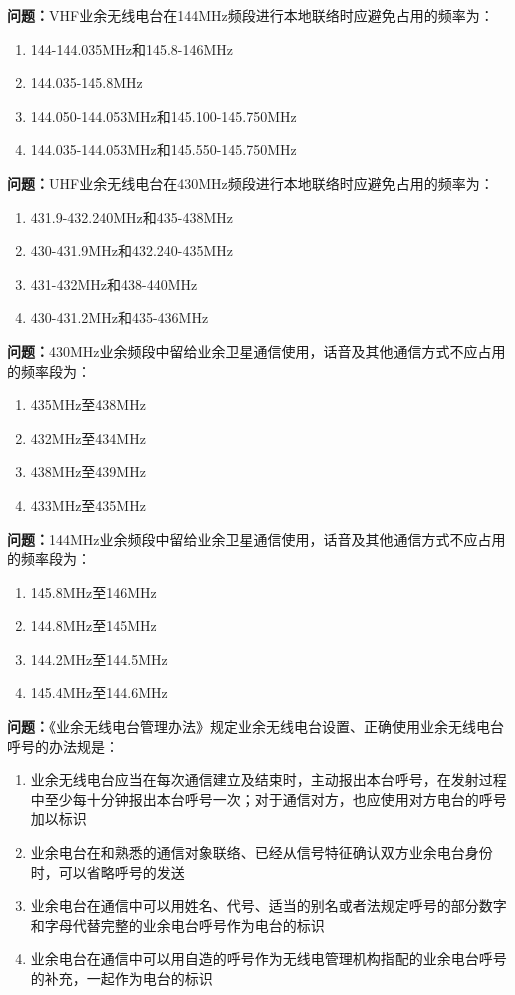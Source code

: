 \documentclass{ctexbook}%
\begin{document}
\textbf{问题：}VHF业余无线电台在144MHz频段进行本地联络时应避免占用的频率为：
\begin{enumerate}[label=\Alph*), leftmargin=3em]
\item 144-144.035MHz和145.8-146MHz
\item 144.035-145.8MHz
\item 144.050-144.053MHz和145.100-145.750MHz
\item 144.035-144.053MHz和145.550-145.750MHz
\end{enumerate}

\textbf{问题：}UHF业余无线电台在430MHz频段进行本地联络时应避免占用的频率为：
\begin{enumerate}[label=\Alph*), leftmargin=3em]
\item 431.9-432.240MHz和435-438MHz
\item 430-431.9MHz和432.240-435MHz
\item 431-432MHz和438-440MHz
\item 430-431.2MHz和435-436MHz
\end{enumerate}

\textbf{问题：}430MHz业余频段中留给业余卫星通信使用，话音及其他通信方式不应占用的频率段为：
\begin{enumerate}[label=\Alph*), leftmargin=3em]
\item 435MHz至438MHz
\item 432MHz至434MHz
\item 438MHz至439MHz
\item 433MHz至435MHz
\end{enumerate}

\textbf{问题：}144MHz业余频段中留给业余卫星通信使用，话音及其他通信方式不应占用的频率段为：
\begin{enumerate}[label=\Alph*), leftmargin=3em]
\item 145.8MHz至146MHz
\item 144.8MHz至145MHz
\item 144.2MHz至144.5MHz
\item 145.4MHz至144.6MHz
\end{enumerate}

\textbf{问题：}《业余无线电台管理办法》规定业余无线电台设置、正确使用业余无线电台呼号的办法规是：
\begin{enumerate}[label=\Alph*), leftmargin=3em]
\item 业余无线电台应当在每次通信建立及结束时，主动报出本台呼号，在发射过程中至少每十分钟报出本台呼号一次；对于通信对方，也应使用对方电台的呼号加以标识
\item 业余电台在和熟悉的通信对象联络、已经从信号特征确认双方业余电台身份时，可以省略呼号的发送
\item 业余电台在通信中可以用姓名、代号、适当的别名或者法规定呼号的部分数字和字母代替完整的业余电台呼号作为电台的标识
\item 业余电台在通信中可以用自造的呼号作为无线电管理机构指配的业余电台呼号的补充，一起作为电台的标识
\end{enumerate}
\end{document}
